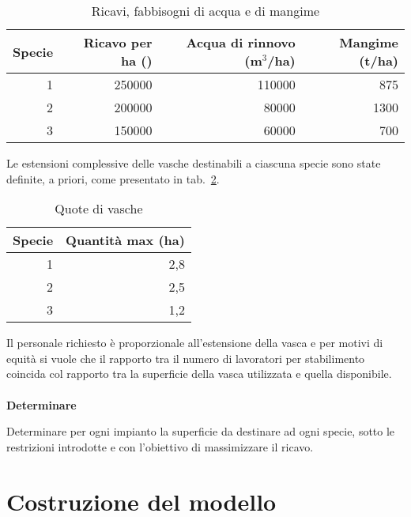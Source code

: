 \documentclass{beamer}
\begin{document}
\begin{frame}[allowframebreaks]
\begin{table}
 \begin{tabular}{rrrr}
  \toprule
  \multicolumn{1}{c}{\textbf{Specie}} &
  \multicolumn{1}{p{2cm}}{\centering\textbf{Ricavo per ha (\EUR{})}} &
  \multicolumn{1}{p{2cm}}{\centering\textbf{Acqua di rinnovo (m$^3$/ha)}} &
  \multicolumn{1}{p{2cm}}{\centering\textbf{Mangime (t/ha)}}\\
  \midrule
  1 & 250000 & 110000 &  875\\
  2 & 200000 &  80000 & 1300\\
  3 & 150000 &  60000 &  700\\
  \bottomrule
 \end{tabular}
  \caption{Ricavi, fabbisogni di acqua e di mangime}\label{tbl:fabbisogni}
\end{table}

Le estensioni complessive delle vasche destinabili a ciascuna specie sono state definite, a priori, come presentato
in tab.~\ref{tbl:quote}.

\begin{table}
 \begin{tabular}{rr}
  \toprule
  \multicolumn{1}{c}{\textbf{Specie}} &
  \multicolumn{1}{p{2.5cm}}{\centering\textbf{Quantit\`a max (ha)}}\\
  \midrule
  1 & 2,8\\
  2 & 2,5\\
  3 & 1,2\\
  \bottomrule
 \end{tabular}
  \caption{Quote di vasche}\label{tbl:quote}
\end{table}

Il personale richiesto \`e proporzionale all'estensione della vasca e per motivi di equit\`a
si vuole che il rapporto tra il numero di lavoratori per stabilimento coincida col
rapporto tra la superficie della vasca utilizzata e quella disponibile.\\~\\

\textbf{Determinare}

Determinare per ogni impianto la superficie da destinare ad ogni specie,
sotto le restrizioni introdotte e con l'obiettivo di massimizzare il ricavo.
\end{frame}

\section{Costruzione del modello}
\end{document}
